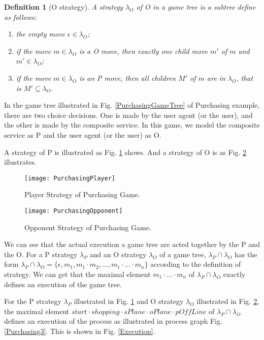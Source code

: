 \documentclass{fac}
\newtheorem{definition}{Definition}[section]
\begin{document}
\begin{definition}[O strategy]
A strategy $\lambda_O$ of O in a game tree is a subtree define as follows:

\begin{enumerate}
  \item the empty move $\epsilon \in \lambda_O$;
  \item if the move $m \in \lambda_O$ is a O move, then exactly one child move $m'$ of $m$ and $m' \in \lambda_O$;
  \item if the move $m \in \lambda_O$ is an P move, then all children $M'$ of $m$ are in $\lambda_O$, that is $M' \subseteq \lambda_O$.
\end{enumerate}
\end{definition}

In the game tree illustrated in Fig. \ref{PurchasingGameTree} of Purchasing example, there are two choice decisions. One is made by the user agent (or the user), and the other is made by the composite service. In this game, we model the composite service as P and the user agent (or the user) as O.

A strategy of P is illustrated as Fig. \ref{PurchasingPlayer} shows. And a strategy of O is as Fig. \ref{PurchasingOpponent} illustrates.

\begin{figure}
  \centering
\texttt{[image: PurchasingPlayer]}
  \caption{Player Strategy of Purchasing Game.}
  \label{PurchasingPlayer}
\end{figure}

\begin{figure}
  \centering
\texttt{[image: PurchasingOpponent]}
  \caption{Opponent Strategy of Purchasing Game.}
  \label{PurchasingOpponent}
\end{figure}

We can see that the actual execution a game tree are acted together by the P and the O. For a P strategy $\lambda_P$ and an O strategy $\lambda_O$ of a game tree, $\lambda_P \cap \lambda_O$ has the form $\lambda_P \cap \lambda_O=\{\epsilon,m_1,m_1\cdot m_2,...,m_1\cdot...\cdot m_n\}$ according to the definition of strategy. We can get that the maximal element $m_1\cdot...\cdot m_n$ of $\lambda_P \cap \lambda_O$ exactly defines an execution of the game tree.

For the P strategy $\lambda_P$ illustrated in Fig. \ref{PurchasingPlayer} and O strategy $\lambda_O$ illustrated in Fig. \ref{PurchasingOpponent}, the maximal element $start\cdot shopping\cdot sPlane \cdot oPlane \cdot pOffLine$ of $\lambda_P \cap \lambda_O$ defines an execution of the process as illustrated in process graph Fig. \ref{Purchasing3}. This is shown in Fig. \ref{Execution}.
\end{document}
